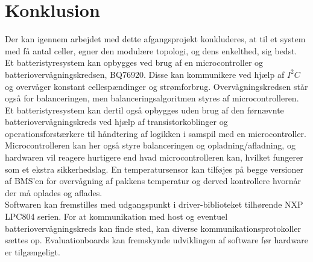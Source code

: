 \chapter{Konklusion} \label{kap:konklusion}
Der kan igennem arbejdet med dette afgangsprojekt konkluderes, at til et system med få antal celler, egner den modulære topologi, og dens enkelthed, sig bedst. \\

Et batteristyresystem kan opbygges ved brug af en microcontroller og batteriovervågningskredsen, BQ76920. Disse kan kommunikere ved hjælp af $I^2C$ og overvåger konstant cellespændinger og strømforbrug. Overvågningskredsen står også for balanceringen, men balanceringsalgoritmen styres af microcontrolleren. \\

Et batteristyresystem kan dertil også opbygges uden brug af den førnævnte batteriovervågningskreds ved hjælp af transistorkoblinger og operationsforstærkere til håndtering af logikken i samspil med en microcontroller. Microcontrolleren kan her også styre balanceringen og opladning/afladning, og hardwaren vil reagere hurtigere end hvad microcontrolleren kan, hvilket fungerer som et ekstra sikkerhedslag. En temperatursensor kan tilføjes på begge versioner af BMS'en for overvågning af pakkens temperatur og derved kontrollere hvornår der må oplades og aflades. \\

Softwaren kan fremstilles med udgangspunkt i driver-biblioteket tilhørende NXP LPC804 serien. For at kommunikation med host og eventuel batteriovervågningskreds kan finde sted, kan diverse kommunikationsprotokoller sættes op. Evaluationboards kan fremskynde udviklingen af software før hardware er tilgængeligt. 